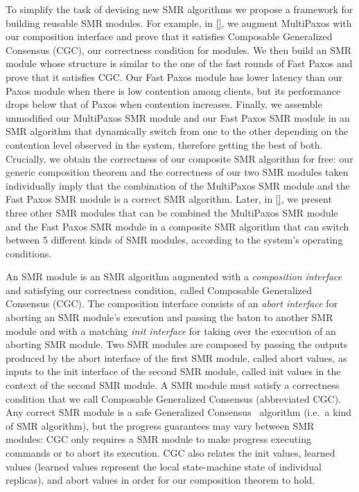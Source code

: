 To simplify the task of devising new SMR algorithms we propose a framework
for building reusable SMR modules. For example, in \cref{}, we augment
MultiPaxos with our composition interface and prove that it satisfies Composable
Generalized Consensus (CGC), our correctness condition for modules. We then
build an SMR module whose structure is similar to the one of the fast rounds of
Fast Paxos and prove that it satisfies CGC\@. Our Fast Paxos module has lower
latency than our Paxos module when there is low contention among clients, but
its performance drops below that of Paxos when contention increases. Finally,
we assemble unmodified our MultiPaxos SMR module and our Fast Paxos SMR module
in an SMR algorithm that dynamically switch from one to the other depending on
the contention level observed in the system, therefore getting the best of both.
Crucially, we obtain the correctness of our composite SMR algorithm for free:
our generic composition theorem and the correctness of our two SMR modules taken
individually imply that the combination of the MultiPaxos SMR module and the
Fast Paxos SMR module is a correct SMR algorithm. Later, in \cref{}, we present
three other SMR modules that can be combined the MultiPaxos SMR module and the
Fast Paxos SMR module in a composite SMR algorithm that can switch between 5
different kinds of SMR modules, according to the system's operating conditions.

An SMR module is an SMR algorithm augmented with a \emph{composition interface}
and satisfying our correctness condition, called Composable Generalized
Consensus (CGC). The composition interface consists of an \emph{abort interface}
for aborting an SMR module's execution and passing the baton to another
SMR module and with a matching \emph{init interface} for taking over the
execution of an aborting SMR module. Two SMR modules are composed by passing
the outputs produced by the abort interface of the first SMR module, called
abort values, as inputs to the init interface of the second SMR module,
called init values in the context of the second SMR module. A SMR module
must satisfy a correctness condition that we call Composable Generalized
Consensus (abbreviated CGC). Any correct SMR module is a safe Generalized
Consensus~\cite{Lamport05GeneralizeConsensus} algorithm (i.e.\ a kind of SMR
algorithm), but the progress guarantees may vary between SMR modules: CGC only
requires a SMR module to make progress executing commands or to abort its
execution. CGC also relates the init values, learned values (learned values
represent the local state-machine state of individual replicas), and abort
values in order for our composition theorem to hold.



